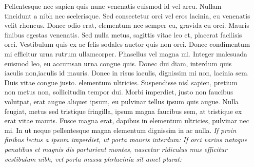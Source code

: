 \documentclass[11pt,letterpaper,openany]{scrbook}
\DeclareRobustCommand{\bskfamily}{%
  \fontencoding{OT1}%
  \fontfamily{bsk}%
  \selectfont}
\begin{document}
\begin{sloppypar}
Pellentesque nec sapien quis nunc venenatis euismod id vel arcu. Nullam tincidunt a nibh nec scelerisque. Sed consectetur orci vel eros lacinia, eu venenatis velit rhoncus. Donec odio erat, elementum nec semper eu, gravida eu orci. Mauris finibus egestas venenatis. Sed nulla metus, sagittis vitae leo et, placerat facilisis orci. Vestibulum quis ex ac felis sodales auctor quis non orci. Donec condimentum mi efficitur urna rutrum ullamcorper. Phasellus vel magna mi. Integer malesuada euismod leo, eu accumsan urna congue quis. Donec dui diam, interdum quis iaculis non,iaculis id mauris. Donec in risus iaculis, dignissim mi non, lacinia sem. Duis vitae congue justo. elementum ultricies. Suspendisse nisl sapien, pretium non metus non, sollicitudin tempor dui. Morbi imperdiet, justo non faucibus volutpat, erat augue aliquet ipsum, eu pulvinar tellus ipsum quis augue. Nulla feugiat, metus sed tristique fringilla, ipsum magna faucibus sem, at tristique ex erat vitae mauris. Fusce magna erat, dapibus in elementum ultricies, pulvinar nec mi. In ut neque pellentesque magna elementum dignissim in ac nulla. \textit{If proin finibus lectus a ipsum imperdiet, ut porta mauris interdum:} {\bskfamily{\bfseries In tellus elit, tincidunt vel scelerisque at, gravida non augue.}} \textit{If orci varius natoque penatibus et magnis dis parturient montes, nascetur ridiculus mus efficitur vestibulum nibh, vel porta massa phrlacinia sit amet plarat:} {\bskfamily{\bfseries Aenean maximus cursus ipsumullam egestas a nisi sit amet sagittis teers.}}

\end{sloppypar}
\end{document}
